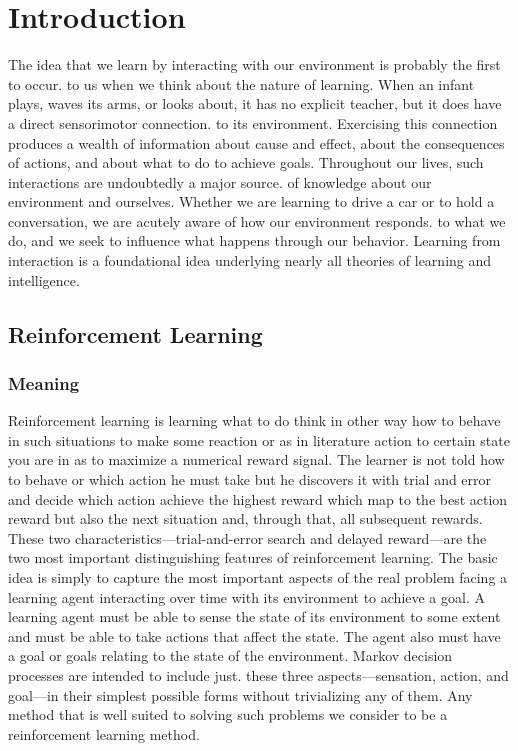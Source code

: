 \chapter{Introduction}
The idea that we learn by interacting with our environment is probably the first to occur.
to us when we think about the nature of learning. When an infant plays, waves its arms,
or looks about, it has no explicit teacher, but it does have a direct sensorimotor connection.
to its environment. Exercising this connection produces a wealth of information about
cause and effect, about the consequences of actions, and about what to do to achieve goals. Throughout our lives, such interactions are undoubtedly a major source. of knowledge about our environment and ourselves. Whether we are learning to drive a car or to hold a conversation, we are acutely aware of how our environment responds. to what we do, and we seek to influence what happens through our behavior. Learning from interaction is a foundational idea underlying nearly all theories of learning and intelligence.

\section{Reinforcement Learning}
\subsection{Meaning}
Reinforcement learning is learning what to do think in other way how to behave in such situations to make some reaction or as in literature action to certain state you are in 
as to maximize a numerical reward signal. The learner is not told how to behave or which action he must take but he discovers it with trial and error and decide which action achieve the highest reward which map to the best action reward but also the next situation and, through that, all subsequent rewards. These two characteristics—trial-and-error search and delayed reward—are the two most important distinguishing features of reinforcement learning.
The basic idea is simply to capture the most important aspects of the real problem facing a learning agent interacting over time with its environment to achieve a goal. A learning agent
must be able to sense the state of its environment to some extent and must be able to
take actions that affect the state. The agent also must have a goal or goals relating to
the state of the environment. Markov decision processes are intended to include just.
these three aspects—sensation, action, and goal—in their simplest possible forms without
trivializing any of them. Any method that is well suited to solving such problems we
consider to be a reinforcement learning method.

